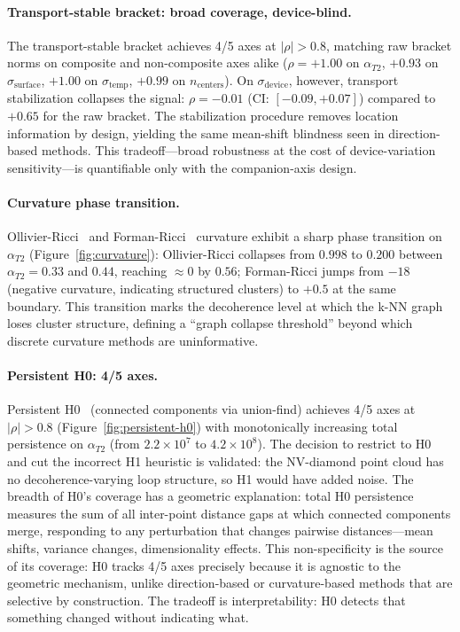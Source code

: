 \documentclass[11pt]{article}
\begin{document}
\paragraph{Transport-stable bracket: broad coverage, device-blind.}
The transport-stable bracket achieves 4/5 axes at $|\rho| > 0.8$,
matching raw bracket norms on composite and non-composite axes alike
($\rho = +1.00$ on $\alpha_{T2}$, $+0.93$ on $\sigma_\text{surface}$,
$+1.00$ on $\sigma_\text{temp}$, $+0.99$ on $n_\text{centers}$).  On
$\sigma_\text{device}$, however, transport stabilization collapses the
signal: $\rho = -0.01$ (CI: $[-0.09, +0.07]$) compared to $+0.65$ for
the raw bracket.  The stabilization procedure removes location
information by design, yielding the same mean-shift blindness seen in
direction-based methods.  This tradeoff---broad robustness at the cost
of device-variation sensitivity---is quantifiable only with the
companion-axis design.

\paragraph{Curvature phase transition.}
Ollivier-Ricci~\citep{ollivier2009ricci} and
Forman-Ricci~\citep{forman2003bochner} curvature exhibit a sharp phase
transition on $\alpha_{T2}$ (Figure~\ref{fig:curvature}): Ollivier-Ricci collapses from $0.998$ to
$0.200$ between $\alpha_{T2} = 0.33$ and $0.44$, reaching $\approx 0$
by $0.56$; Forman-Ricci jumps from $-18$ (negative curvature,
indicating structured clusters) to $+0.5$ at the same boundary.  This
transition marks the decoherence level at which the k-NN graph loses
cluster structure, defining a ``graph collapse threshold'' beyond which
discrete curvature methods are uninformative.

\paragraph{Persistent H0: 4/5 axes.}
Persistent H0~\citep{ghrist2008barcodes} (connected components via
union-find) achieves 4/5 axes at $|\rho| > 0.8$ (Figure~\ref{fig:persistent-h0}) with monotonically increasing total persistence on
$\alpha_{T2}$ (from $2.2 \times 10^7$ to $4.2 \times 10^8$).  The
decision to restrict to H0 and cut the incorrect H1 heuristic is
validated: the NV-diamond point cloud has no decoherence-varying loop
structure, so H1 would have added noise.  The breadth of H0's coverage
has a geometric explanation: total H0 persistence measures the sum of
all inter-point distance gaps at which connected components merge,
responding to any perturbation that changes pairwise distances---mean
shifts, variance changes, dimensionality effects.  This non-specificity
is the source of its coverage: H0 tracks 4/5 axes precisely because
it is agnostic to the geometric mechanism, unlike direction-based or
curvature-based methods that are selective by construction.  The
tradeoff is interpretability: H0 detects that something changed
without indicating what.
\end{document}
